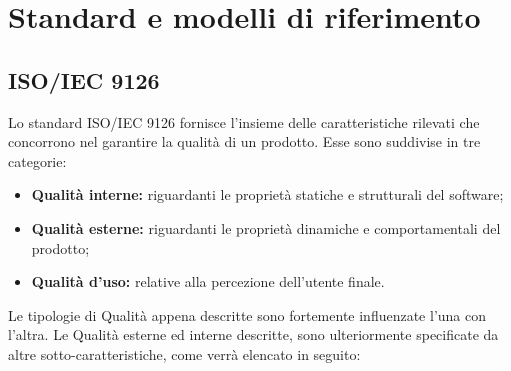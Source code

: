 \section{Standard e modelli di riferimento}
\subsection{ISO/IEC 9126}
Lo standard ISO/IEC 9126 fornisce l'insieme delle caratteristiche rilevati che concorrono nel garantire la qualità di un prodotto. Esse sono suddivise in tre categorie:
\begin{itemize}
	\item \textbf{Qualità interne:} riguardanti le proprietà statiche e strutturali del software;
	\item \textbf{Qualità esterne:} riguardanti le proprietà dinamiche e comportamentali del prodotto;
	\item \textbf{Qualità d'uso:} relative alla percezione dell'utente finale.
\end{itemize}
Le tipologie di Qualità appena descritte sono fortemente influenzate l'una con l'altra. Le Qualità esterne ed interne descritte, sono ulteriormente specificate da altre sotto-caratteristiche, come verrà elencato in seguito:
